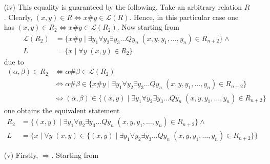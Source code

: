 \documentclass [11pt]{article}
\begin{document}
\begin{enumerate}
\item[(iv)] This equality is guaranteed by the following. Take an arbitrary relation $R$. Clearly, $(x,y) \in R \iff x\#y \in \mathcal{L}(R)$. Hence, in this particular case one has $(x,y) \in R_2 \iff x\#y \in \mathcal{L}(R_2)$. Now starting from  
\begin{equation*}
\begin{split}
\mathcal{L}(R_2) &= \{x\#y \mid \exists y_1 \forall y_2\exists y_3\dots Q y_n  \; (x,y,y_1,\ldots,y_n) \in R_{n+2}\}  \land \\ 
L &= \{x \mid \forall y \; (x,y) \in R_2\}  
\end{split}
\end{equation*}
due to 
 \begin{equation*}
\begin{split}
(\alpha,\beta) \in R_2 &\iff \alpha\#\beta \in\mathcal{L}(R_2) \\
&\iff \alpha\#\beta \in \{ x\#y \mid  \exists y_1 \forall y_2\exists y_3\dots Q y_n  \; (x,y,y_1,\ldots,y_n) \in R_{n+2}\}  \\
&\iff (\alpha,\beta) \in \{(x,y) \mid \exists y_1 \forall y_2\exists y_3\dots Q y_n   \; (x,y,y_1,\ldots,y_n) \in R_{n+2}\} 
\end{split}
\end{equation*}
one obtains the equivalent statement
\begin{equation*}
\begin{split}
R_2 &= \{(x,y) \mid  \exists y_1 \forall y_2\exists y_3\dots Q y_n   \; (x,y,y_1,\ldots,y_n) \in R_{n+2}\}  \land \\ 
L &= \{x \mid \forall y \; (x,y) \in  \{(x,y) \mid  \exists y_1 \forall y_2\exists y_3\dots Q y_n  \; (x,y,y_1,\ldots,y_n) \in R_{n+2}\}\} 
\end{split}
\end{equation*}



\item[(v)] Firstly, $\Rightarrow$. Starting from 


\end{enumerate}
\end{document}
